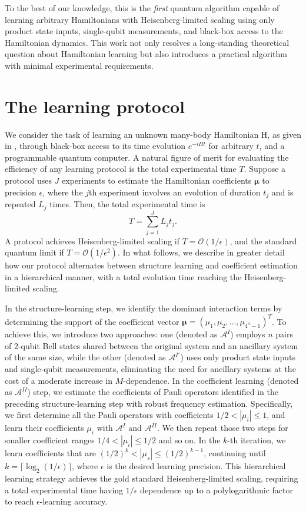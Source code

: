 \documentclass[twocolumn,superscriptaddress,aps,showpacs,amsmath,amstex,amssymb,citeautoscript,floatfix,pra,preprintnumbers]{revtex4-2}
\newcounter{alg}
\theoremstyle{plain}
\theoremstyle{plain}
\theoremstyle{plain}
\theoremstyle{plain}
\theoremstyle{plain}
\theoremstyle{plain}
\newcommand{\eq}[1]{\begin{equation}#1\end{equation}}
\begin{document}
To the best of our knowledge, this is the \emph{first} quantum algorithm capable of learning arbitrary Hamiltonians with Heisenberg-limited scaling using only product state inputs, single-qubit measurements, and black-box access to the Hamiltonian dynamics. This work not only resolves a long-standing theoretical question about Hamiltonian learning but also introduces a practical algorithm with minimal experimental requirements. 




\section{The learning protocol}

We consider the task of learning an unknown many-body Hamiltonian H, as given in , through black-box access to its time evolution $e^{-iHt}$ for arbitrary $t$, and a programmable quantum computer. A natural figure of merit for evaluating the efficiency of any learning protocol is the total experimental time $T$. Suppose a protocol uses $J$ experiments to estimate the Hamiltonian coefficients $\bm{\mu}$ to precision $\epsilon$, where the $j$th experiment involves an evolution of duration $t_j$ and is repeated $L_j$ times. Then, the total experimental time is
\eq{T = \sum_{j=1}^{J} L_j t_j.\label{eq:total_time_main}}
A protocol achieves Heisenberg-limited scaling if $T = \mathcal{O}(1/\epsilon)$, and the standard quantum limit if $T = \mathcal{O}(1/\epsilon^2)$. In what follows, we describe in greater detail how our protocol alternates between structure learning and coefficient estimation in a hierarchical manner, with a total evolution time reaching the Heisenberg-limited scaling.

In the structure-learning step, we identify the dominant interaction terms by determining the support of the coefficient vector $\boldsymbol{\mu}=(\mu_1, \mu_2, \ldots, \mu_{4^n-1})^{T}$. 
To achieve this, we introduce two approaches: one (denoted as $\mathcal{A}^I$) employs $n$ pairs of 2-qubit Bell states shared between the original system and an ancillary system of the same size, while the other (denoted as $\mathcal{A}^{I'}$) uses only product state inputs and single-qubit measurements, eliminating the need for ancillary systems at the cost of a moderate increase in $M$-dependence. 
In the coefficient learning  (denoted as $\mathcal{A}^{II}$) step, we estimate the coefficients of Pauli operators identified in the preceding structure-learning step with robust frequency estimation.
Specifically, we first determine all the Pauli operators with coefficients $1/2< |\mu_i|\leq 1$, and learn their coefficients $\mu_i$ with $\mathcal{A}^I$ and $\mathcal{A}^{II}$. We then repeat those two steps for smaller coefficient ranges $1/4< |\mu_i|\leq 1/2$ and so on. In the $k$-th iteration, we learn coefficients that are $(1/2)^k< |\mu_s|\leq (1/2)^{k-1}$, continuing until $k=\lceil\log_2( 1/\epsilon )\rceil$, where $\epsilon$ is the desired learning precision. This hierarchical learning strategy achieves the gold standard Heisenberg-limited scaling, requiring a total experimental time having $1/\epsilon$ dependence up to a polylogarithmic factor to reach $\epsilon$-learning accuracy. 
\end{document}
